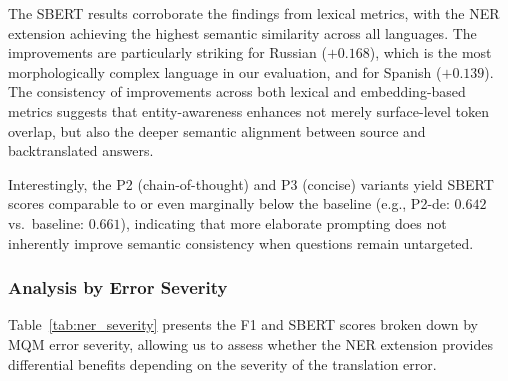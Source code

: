 The SBERT results corroborate the findings from lexical metrics, with the NER extension achieving the highest semantic similarity across all languages. The improvements are particularly striking for Russian ($+0.168$), which is the most morphologically complex language in our evaluation, and for Spanish ($+0.139$). The consistency of improvements across both lexical and embedding-based metrics suggests that entity-awareness enhances not merely surface-level token overlap, but also the deeper semantic alignment between source and backtranslated answers.

Interestingly, the P2 (chain-of-thought) and P3 (concise) variants yield SBERT scores comparable to or even marginally below the baseline (e.g., P2-de: $0.642$ vs.\ baseline: $0.661$), indicating that more elaborate prompting does not inherently improve semantic consistency when questions remain untargeted.

\subsubsection{Analysis by Error Severity}

Table~\ref{tab:ner_severity} presents the F1 and SBERT scores broken down by MQM error severity, allowing us to assess whether the NER extension provides differential benefits depending on the severity of the translation error.

